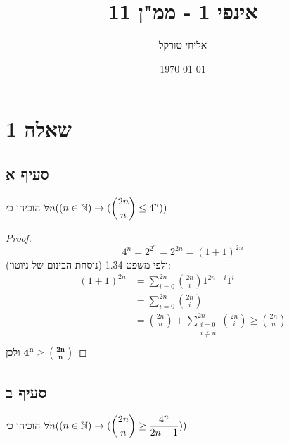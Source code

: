 \documentclass{article}
\title{אינפי 1 - ממ"ן 11}
\author{אליחי טורקל \ID}
\date\today
\begin{document}
	\maketitle %

	\section*{שאלה 1}
	\subsection*{סעיף א}
	הוכיחו כי
	 $\displaystyle{\forall n( (n \in \mathbb{N}) \to ({2n \choose n} \leq 4^n) )}$

	\begin{proof}
		\[ 4^n = 2^{2^n}=2^{2n}=(1+1)^{2n} \]
		ולפי משפט 1.34 (נוסחת הבינום של ניוטון):
		\begin{align*}
			(1+1)^{2n} &= \sum_{i=0}^{2n}{{2n \choose i}1^{2n-i}1^i} \\[1em]
			&= \sum_{i=0}^{2n}{2n \choose i} \\[1em]
			&= {2n \choose n} + \sum_{\substack{i=0 \\ i \neq n}}^{2n}{2n \choose i} \geq {2n \choose n} \\
		\end{align*}
		ולכן
		$\bm{4^n \geq {2n \choose n}}$
	\end{proof}


	\subsection*{סעיף ב}
	הוכיחו כי
	 $\displaystyle{\forall n( (n \in \mathbb{N}) \to ( {2n \choose n} \geq \frac{4^n}{2n+1} ) )}$
\end{document}
